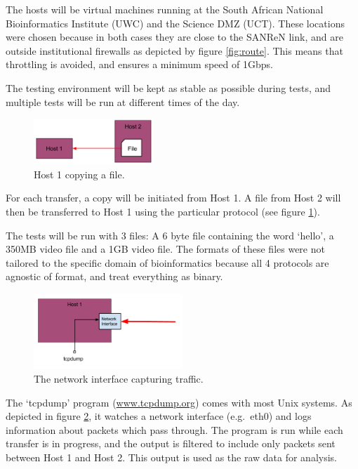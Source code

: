 \documentclass{sig-alternate-05-2015}
\begin{document}
The hosts will be virtual machines running at the South African National Bioinformatics Institute (UWC) and the Science DMZ (UCT). These locations were chosen because in both cases they are close to the SANReN link, and are outside institutional firewalls as depicted by figure \ref{fig:route}. This means that throttling is avoided, and ensures a minimum speed of 1Gbps.

The testing environment will be kept as stable as possible during tests, and multiple tests will be run at different times of the day.

\begin{figure}[H]
	\centering
	\includegraphics[width=0.4\textwidth]{img/basic_transfer_example.png}
	\caption{Host 1 copying a file.
	         \label{fig:copy_example}}
\end{figure}
For each transfer, a copy will be initiated from Host 1. A file from Host 2 will then be transferred to Host 1 using the particular protocol (see figure \ref{fig:copy_example}).

The tests will be run with 3 files: A 6 byte file containing the word `hello', a 350MB video file and a 1GB video file. The formats of these files were not tailored to the specific domain of bioinformatics because all 4 protocols are agnostic of format, and treat everything as binary.

\begin{figure}[H]
	\centering
	\includegraphics[width=0.5\textwidth]{img/if_example.png}
	\caption{The network interface capturing traffic.
             \label{fig:interface_example}}
\end{figure}
The `tcpdump' program (\url{www.tcpdump.org}) comes with most Unix systems. As depicted in figure \ref{fig:interface_example}, it watches a network interface (e.g.\ eth0) and logs information about packets which pass through. The program is run while each transfer is in progress, and the output is filtered to include only packets sent between Host 1 and Host 2. This output is used as the raw data for analysis.
\end{document}
